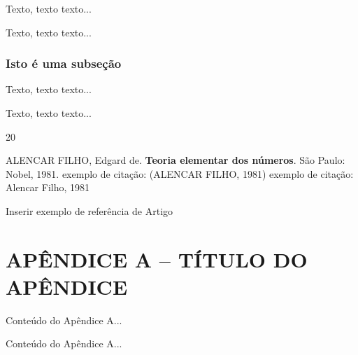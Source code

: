 \documentclass[12pt, a4paper]{report}
\theoremstyle{remark}
\theoremstyle{definition}
\theoremstyle{definition}
\theoremstyle{plain}
\theoremstyle{plain}
\theoremstyle{plain}
\theoremstyle{definition}
\begin{document}
Texto, texto texto...

Texto, texto texto...

\subsection{Isto é uma subseção}

Texto, texto texto...

Texto, texto texto...


\begin{thebibliography}{20}
\thispagestyle{myheadings}

ALENCAR FILHO, Edgard de. \textbf{Teoria elementar dos números}. São Paulo: Nobel, 1981.
exemplo de citação: (ALENCAR FILHO, 1981)
exemplo de citação: Alencar Filho, 1981

Inserir exemplo de referência de Artigo






\end{thebibliography}


\appendix
\setcounter{chapter}{0}
\renewcommand{\thechapter}{\Alph{chapter}}
\chapter*{\hfill APÊNDICE A -- TÍTULO DO APÊNDICE \hfill}
\thispagestyle{myheadings}

Conteúdo do Apêndice A...

Conteúdo do Apêndice A...
\end{document}
